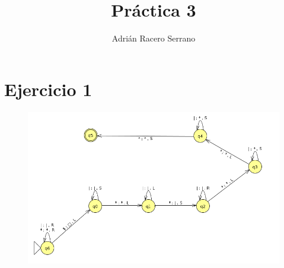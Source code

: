 \documentclass[11pt]{article}
\title{\textbf{Práctica 3}}
\author{Adrián Racero Serrano}
\date{}
\begin{document}
\maketitle
\thispagestyle{empty}

\section*{Ejercicio 1}
\begin{figure}[htp]
\centering
\includegraphics[scale=0.60]{ejercicio1.png}
\end{figure} 

\newpage
\end{document}
